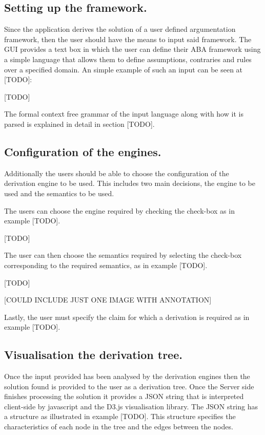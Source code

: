 \subsection{Setting up the framework.}

Since the application derives the solution of a user defined argumentation framework, then the user should have the means to input said framework. The GUI provides a text box in which the user can define their ABA framework using a simple language that allows them to define assumptions, contraries and rules over a specified domain. An simple example of such an input can be seen at [TODO]:

[TODO]

The formal context free grammar of the input language along with how it is parsed is explained in detail in section [TODO].

\subsection{Configuration of the engines.}

Additionally the users should be able to choose the configuration of the derivation engine to be used. This includes two main decisions, the engine to be used and the semantics to be used.

The users can choose the engine required by checking the check-box as in example [TODO].

[TODO]

The user can then choose the semantics required by selecting the check-box corresponding to the required semantics, as in example [TODO].

[TODO]

[COULD INCLUDE JUST ONE IMAGE WITH ANNOTATION]

Lastly, the user must specify the claim for which a derivation is required as in example [TODO].

\subsection{Visualisation the derivation tree.}

Once the input provided has been analysed by the derivation engines then the solution found is provided to the user as a derivation tree. Once the Server side finishes processing the solution it provides a JSON string that is interpreted client-side by javascript and the D3.js visualisation library. The JSON string has a structure as illustrated in example [TODO]. This structure specifies the characteristics of each node in the tree and the edges between the nodes.

